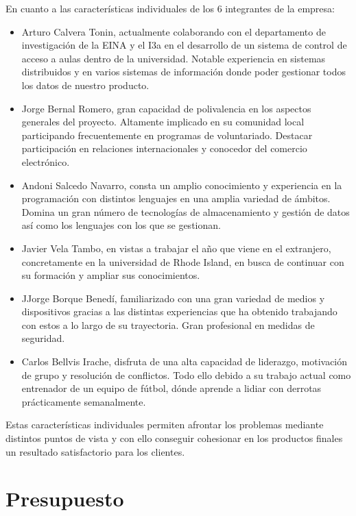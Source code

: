 \documentclass{article}
\begin{document}
En cuanto a las características individuales de los 6 integrantes de la empresa:
\begin{itemize}
   \item Arturo Calvera Tonin, actualmente colaborando con el departamento de investigación de la EINA y el I3a en el desarrollo de un sistema de control de acceso a aulas dentro de la universidad. Notable experiencia en sistemas distribuidos y en varios sistemas de información donde poder gestionar todos los datos de nuestro producto.
   \item Jorge Bernal Romero, gran capacidad de polivalencia en los aspectos generales del proyecto. Altamente implicado en su comunidad local participando frecuentemente en programas de voluntariado. Destacar participación en relaciones internacionales y conocedor del comercio electrónico.
   \item Andoni Salcedo Navarro, consta un amplio conocimiento y experiencia en la programación con distintos lenguajes en una amplia variedad de ámbitos. Domina un gran número de tecnologías de almacenamiento y gestión de datos así como los lenguajes con los que se gestionan.
   \item Javier Vela Tambo, en vistas a trabajar el año que viene en el extranjero, concretamente en la universidad de Rhode Island, en busca de continuar con su formación y ampliar sus conocimientos.
   \item JJorge Borque Benedí, familiarizado con una gran variedad de medios y dispositivos gracias a las distintas experiencias que ha obtenido trabajando con estos a lo largo de su trayectoria. Gran profesional en medidas de seguridad.
   \item Carlos Bellvis Irache, disfruta de una alta capacidad de liderazgo, motivación de grupo y resolución de conflictos. Todo ello debido a su trabajo actual como entrenador de un equipo de fútbol, dónde aprende a lidiar con derrotas prácticamente semanalmente.
\end{itemize}


Estas características individuales permiten afrontar los problemas mediante distintos puntos de vista y con ello conseguir cohesionar en los productos finales un resultado satisfactorio para los clientes.

\pagebreak

\section{Presupuesto}
\end{document}
